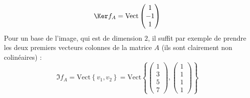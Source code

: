 {{$$\Ker f_A = \textrm{Vect} \begin{pmatrix}1\\-1\\1\end{pmatrix}$$
Pour un base de l'image, qui est de dimension $2$, 
     il suffit par exemple de prendre les deux premiers vecteurs colonnes de la matrice $A$ (ils sont clairement non colinéaires) :
$$\Im f_A = \textrm{Vect} \left\{ v_1, v_2 \right\} = 
\textrm{Vect} \left\{  \begin{pmatrix}1\\3\\5\\7\end{pmatrix},  \begin{pmatrix}1\\1\\1\\1\end{pmatrix} \right\}
$$
}
}
